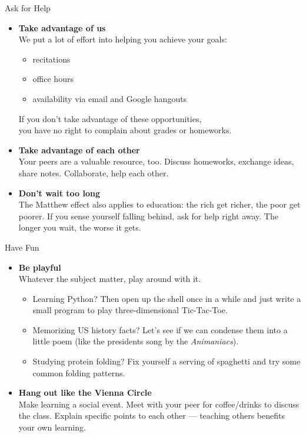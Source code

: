 \documentclass[professionalfonts, xcolor={usenames,svgnames,x11names,table}]{beamer}
\begin{document}
\begin{frame}{Ask for Help}
    \begin{itemize}
        \item \textbf{Take advantage of us}\\
            We put a lot of effort into helping you achieve your goals:
            \begin{itemize}
                \item recitations
                \item office hours
                \item availability via email and Google hangouts
            \end{itemize}
            If you don't take advantage of these opportunities,\\
            you have no right to complain about grades or homeworks. 
            
        \item \textbf{Take advantage of each other}\\
            Your peers are a valuable resource, too.
            Discuss homeworks, exchange ideas, share notes.
            Collaborate, help each other.

        \item \textbf{Don't wait too long}\\
            The Matthew effect also applies to education: the rich get richer, the poor get poorer.
            If you sense yourself falling behind, ask for help right away.
            The longer you wait, the worse it gets.
    \end{itemize}
\end{frame}

\begin{frame}{Have Fun}
    \begin{itemize}
        \item \textbf{Be playful}\\
            Whatever the subject matter, play around with it.
            \begin{itemize}
                \item Learning Python? Then open up the shell once in a while and just write a small program to play three-dimensional Tic-Tac-Toe.
                \item Memorizing US history facts? Let's see if we can condense them into a little poem (like the presidents song by the \emph{Animaniacs}).
                \item Studying protein folding? Fix yourself a serving of spaghetti and try some common folding patterns.
            \end{itemize}

        \item \textbf{Hang out like the Vienna Circle}\\
            Make learning a social event.
            Meet with your peer for coffee\slash drinks to discuss the class.
            Explain specific points to each other --- teaching others benefits your own learning.
    \end{itemize}
\end{frame}
\end{document}
